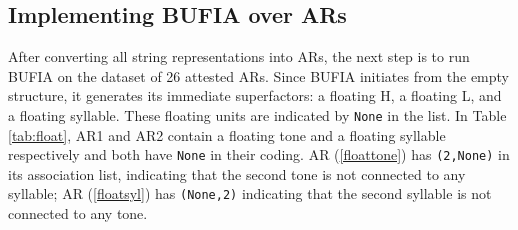 \documentclass[11pt,letterpaper]{article}
\begin{document}
\subsection{Implementing BUFIA over ARs}
After converting all string representations into ARs, the next step is to run BUFIA on the dataset of 26 attested ARs. Since BUFIA initiates from the empty structure, it generates its immediate superfactors: a floating H, a floating L, and a floating syllable. These floating units are indicated by \verb*|None| in the list. In Table \ref{tab:float}, AR1 and AR2 contain a floating tone and a floating syllable respectively and both have \verb*|None| in their coding. AR (\ref{floattone}) has \verb*|(2,None)| in its association list, indicating that the second tone is not connected to any syllable; AR (\ref{floatsyl}) has \verb*|(None,2)| indicating that the second syllable is not connected to any tone.
\end{document}
